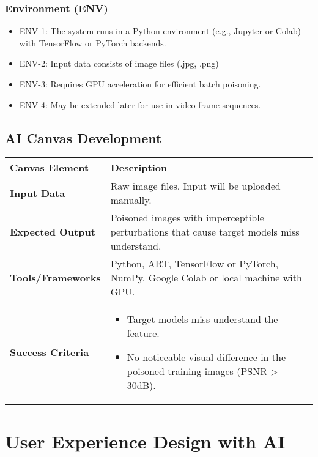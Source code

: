 \subsubsection*{Environment (ENV)}
\begin{itemize}
    \item ENV-1: The system runs in a Python environment (e.g., Jupyter or Colab) with TensorFlow or PyTorch backends.
    \item ENV-2: Input data consists of image files (.jpg, .png)
    \item ENV-3: Requires GPU acceleration for efficient batch poisoning.
    \item ENV-4: May be extended later for use in video frame sequences.
\end{itemize}

\subsection{AI Canvas Development}

\begin{table}[h]
\centering
\begin{tabular}{|p{4cm}|p{10cm}|}
\hline
\textbf{Canvas Element} & \textbf{Description} \\
\hline
\textbf{Input Data} & Raw image files. Input will be uploaded manually. \\
\hline
\textbf{Expected Output} & Poisoned images with imperceptible perturbations that cause target models miss understand. \\
\hline
\textbf{Tools/Frameworks} & Python, ART, TensorFlow or PyTorch, NumPy, Google Colab or local machine with GPU. \\
\hline
\textbf{Success Criteria} & 
\begin{itemize}
    \item Target models miss understand the feature.
    \item No noticeable visual difference in the poisoned training images (PSNR > 30dB).
\end{itemize} \\
\hline
\end{tabular}
\end{table}

\section{User Experience Design with AI}
\label{section:User-Experience-Design-with-AI}


